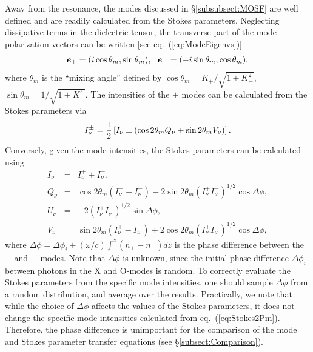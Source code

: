 \documentclass[useAMS,onecolumn,usenatbib,usegraphicx]{mn2e}
\begin{document}
Away from the resonance, the modes discussed in \S\ref{subsubsect:MOSF} are well defined and are 
readily calculated from the Stokes parameters.  Neglecting dissipative terms in the dielectric tensor, 
the transverse part 
of the mode polarization vectors can be written [see eq.~(\ref{eq:ModeEigenvs})]
\begin{eqnarray}
\label{eq:Epm}
\mbox{\boldmath{$e$}}_+ = (i\cos\theta_m,\sin\theta_m),\ \ \mbox{\boldmath{$e$}}_- = (-i\sin\theta_m,\cos\theta_m),
\end{eqnarray}
where $\theta_m$ is the ``mixing angle'' defined by $\cos\theta_m=K_+/\sqrt{1+K_+^2}$, $\sin\theta_m=1/\sqrt{1+K_+^2}$.  
The intensities of the $\pm$ modes can be calculated from the Stokes parameters via
\begin{eqnarray}
\label{eq:Stokes2Pm}
I_{\nu}^{\pm}={1\over 2}\left[I_{\nu}\pm\left(\cos 2\theta_m Q_{\nu} + \sin 2\theta_m V_{\nu}\right)\right].
\end{eqnarray}
Conversely, given the mode intensities, the Stokes parameters can be calculated using
\begin{eqnarray}
\label{eq:Pm2Stokes1}
I_{\nu} & = & I_{\nu}^++I_{\nu}^-,\\
Q_{\nu} & = & \cos 2\theta_m(I_{\nu}^+-I_{\nu}^-)-2\sin 2\theta_m(I_{\nu}^+I_{\nu}^-)^{1/2}\cos\Delta\phi,\\
U_{\nu} & = & -2(I_{\nu}^+I_{\nu}^-)^{1/2}\sin\Delta\phi,\\
\label{eq:Pm2Stokes4}
V_{\nu} & = & \sin 2\theta_m(I_{\nu}^+-I_{\nu}^-)+2\cos 2\theta_m(I_{\nu}^+I_{\nu}^-)^{1/2}\cos\Delta\phi,
\end{eqnarray}
where $\Delta\phi = \Delta\phi_i + (\omega/c)\int^z (n_+-n_-) dz$ is the phase difference between the 
$+$ and $-$ modes.  
Note that $\Delta\phi$ is unknown, since the initial phase difference $\Delta\phi_i$ between photons in the X 
and O-modes is random.  To 
correctly evaluate the Stokes parameters from the specific mode intensities, one should sample $\Delta\phi$ 
from a random distribution, and average over the results.  
Practically, we note that while the choice of $\Delta\phi$ affects the values of the Stokes parameters, it 
does not change the specific mode intensities calculated from eq.~(\ref{eq:Stokes2Pm}).  Therefore, the 
phase difference is unimportant for the comparison of the mode and Stokes parameter transfer equations 
(see \S\ref{subsect:Comparison}).
\end{document}
